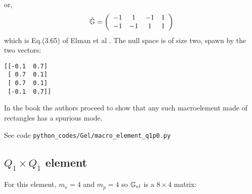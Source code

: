or, 
\[
\tilde{{\mathbb{G}}} = 
\left(
\begin{array}{cccc}
 -1  &   1 &  -1 &   1  \\ 
 -1  &  -1 &   1 &   1  
\end{array}
\right)
\]
which is Eq.(3.65) of Elman et al \cite{elsw}.
The null space is of size two, spawn by the two vectors:
\begin{verbatim}
[[-0.1  0.7]
 [ 0.7  0.1]
 [ 0.7  0.1]
 [-0.1  0.7]]
\end{verbatim}

In the book the authors proceed to show that any such macroelement 
made of rectangles has a spurious mode. 

See code {\tt python\_codes/Gel/macro\_element\_q1p0.py}


\subsection{$Q_1\times Q_1$ element}

For this element, $m_\upnu=4$ and $m_p=4$ so ${\mathbb{G}}_{el}$ is
a $8\times 4$ matrix:

